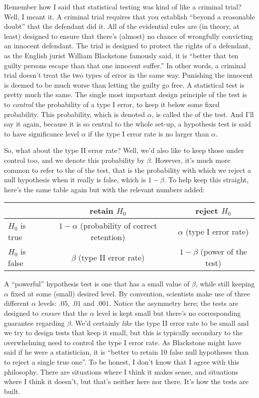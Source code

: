 Remember how I said that statistical testing was kind of like a criminal trial? Well, I meant it. A criminal trial requires that you establish ``beyond a reasonable doubt'' that the defendant did it. All of the evidential rules are (in theory, at least) designed to ensure that there's (almost) no chance of wrongfully convicting an innocent defendant. The trial is designed to protect the rights of a defendant, as the English jurist William Blackstone famously said, it is ``better that ten guilty persons escape than that one innocent suffer.'' In other words, a criminal trial doesn't treat the two types of error in the same way. Punishing the innocent is deemed to be much worse than letting the guilty go free. A statistical test is pretty much the same. The single most important design principle of the test is to {\it control} the probability of a type I error, to keep it below some fixed probability. This probability, which is denoted $\alpha$, is called the  of the test. And I'll say it again, because it is so central to the whole set-up, a hypothesis test is said to have significance level $\alpha$ if the type I error rate is no larger than $\alpha$. 

So, what about the type II error rate? Well, we'd also like to keep those under control too, and we denote this probability by $\beta$. However, it's much more common to refer to the  of the test, that is the probability with which we reject a null hypothesis when it really is false, which is $1-\beta$. To help keep this straight, here's the same table again but with the relevant numbers added:

\begin{center}
\begin{tabular}{l|cc}
 & retain $H_0$ & reject $H_0$ \\ \hline
 $H_0$ is true & $1-\alpha$ (probability of correct retention) & $\alpha$ (type I error rate) \\
 $H_0$ is false & $\beta$ (type II error rate) & $1-\beta$  (power of the test)\\
\end{tabular} 
\end{center}

\noindent
A ``powerful'' hypothesis test is one that has a small value of $\beta$, while still keeping $\alpha$ fixed at some (small) desired level. By convention, scientists make use of three different $\alpha$ levels: $.05$, $.01$ and $.001$. Notice the asymmetry here; the tests are designed to {\it ensure} that the $\alpha$ level is kept small but there's no corresponding guarantee regarding $\beta$. We'd certainly {\it like} the type II error rate to be small and we try to design tests that keep it small, but this is typically secondary to the overwhelming need to control the type I error rate. As Blackstone might have said if he were a statistician, it is ``better to retain 10 false null hypotheses than to reject a single true one''. To be honest, I don't know that I agree with this philosophy. There are situations where I think it makes sense, and situations where I think it doesn't, but that's neither here nor there. It's how the tests are built.


